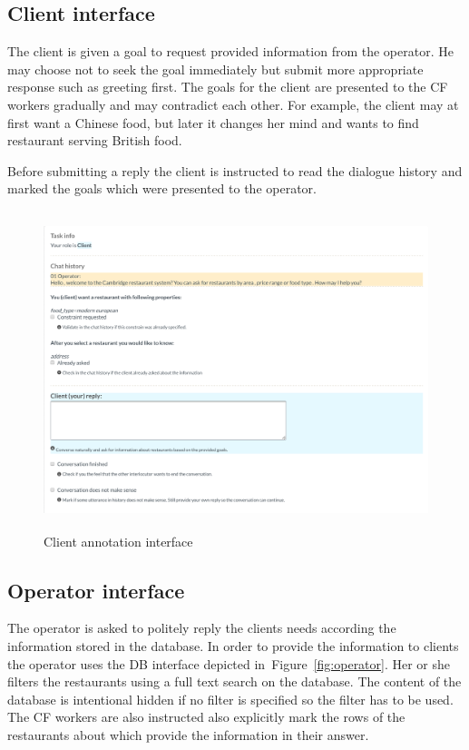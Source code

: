 \documentclass[runningheads,a4paper]{llncs}
\begin{document}
\subsection{Client interface}
\label{sec:client}

The client is given a goal to request provided information from the operator.
He may choose not to seek the goal immediately but submit more appropriate response such as greeting first.
The goals for the client are presented to the CF workers gradually and may contradict each other.
For example, the client may at first want a Chinese food, but later it changes her mind and wants to find restaurant serving British food.

Before submitting a reply the client is instructed to read the dialogue history and marked the goals which were presented to the operator.

\begin{figure}
\begin{center}
\includegraphics[height=25em]{gui-annotators-client}
\caption{Client annotation interface}
\end{center}
\vspace{-0.80em}
\label{fig:client}
\end{figure}

\subsection{Operator interface}
\label{sec:operator}
The operator is asked to politely reply the clients needs according the information stored in the database.
In order to provide the information to clients the operator uses the DB interface depicted in~Figure~\ref{fig:operator}.
Her or she filters the restaurants using a full text search on the database.
The content of the database is intentional hidden if no filter is specified so the filter has to be used.
The CF workers are also instructed also explicitly mark the rows of the restaurants about which provide the information in their answer.
\end{document}
